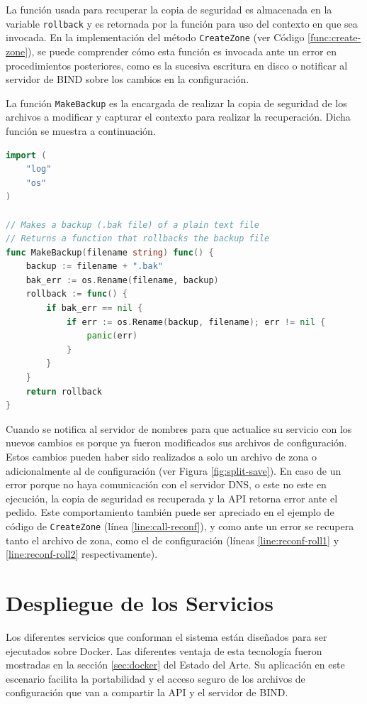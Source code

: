 La función usada para recuperar la copia de seguridad es almacenada en la variable \verb|rollback| y es retornada por la función para uso del contexto en que sea invocada. En la implementación del método \verb|CreateZone| (ver Código \ref{func:create-zone}), se puede comprender cómo esta función es invocada ante un error en procedimientos posteriores, como es la sucesiva escritura en disco o notificar al servidor de BIND sobre los cambios en la configuración.

La función \verb|MakeBackup| es la encargada de realizar la copia de seguridad de los archivos a modificar y capturar el contexto para realizar la recuperación. Dicha función se muestra a continuación.

\begin{lstlisting}[frame=single, language=Go, caption=Función encargada de mantener una copia de seguridad al modificar los archivos de BIND.]
import (
    "log"
    "os"
)

// Makes a backup (.bak file) of a plain text file
// Returns a function that rollbacks the backup file
func MakeBackup(filename string) func() {
    backup := filename + ".bak"
    bak_err := os.Rename(filename, backup)
    rollback := func() {
        if bak_err == nil {
            if err := os.Rename(backup, filename); err != nil {
                panic(err)
            }
        }
    }
    return rollback
}
\end{lstlisting}

Cuando se notifica al servidor de nombres para que actualice su servicio con los nuevos cambios es porque ya fueron modificados sus archivos de configuración. Estos cambios pueden haber sido realizados a solo un archivo de zona o adicionalmente al de configuración (ver Figura \ref{fig:split-save}). En caso de un error porque no haya comunicación con el servidor DNS, o este no este en ejecución, la copia de seguridad es recuperada y la API retorna error ante el pedido. Este comportamiento también puede ser apreciado en el ejemplo de código de \verb|CreateZone| (línea \ref{line:call-reconf}), y como ante un error se recupera tanto el archivo de zona, como el de configuración (líneas \ref{line:reconf-roll1} y \ref{line:reconf-roll2} respectivamente).

\section{Despliegue de los Servicios}

Los diferentes servicios que conforman el sistema están diseñados para ser ejecutados sobre Docker. Las diferentes ventaja de esta tecnología fueron mostradas en la sección \ref{sec:docker} del Estado del Arte. Su aplicación en este escenario facilita la portabilidad y el acceso seguro de los archivos de configuración que van a compartir la API y el servidor de BIND.

